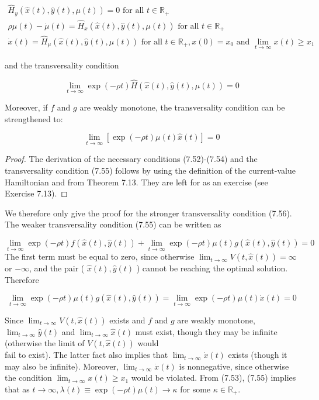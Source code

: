 \documentclass[\topdir/lecture_notes.tex]{subfiles}
\begin{document}
\[
\begin{gathered}
\hat{H}_{y}(\hat{x}(t), \hat{y}(t), \mu(t))=0 \text { for all } t \in \mathbb{R}_{+} \\
\rho \mu(t)-\dot{\mu}(t)=\hat{H}_{x}(\hat{x}(t), \hat{y}(t), \mu(t)) \text { for all } t \in \mathbb{R}_{+} \\
\dot{x}(t)=\hat{H}_{\mu}(\hat{x}(t), \hat{y}(t), \mu(t)) \text { for all } t \in \mathbb{R}_{+}, x(0)=x_{0} \text { and } \lim _{t \rightarrow \infty} x(t) \geq x_{1}
\end{gathered}
\]

and the transversality condition

\[
\lim _{t \rightarrow \infty} \exp (-\rho t) \hat{H}(\hat{x}(t), \hat{y}(t), \mu(t))=0
\]

Moreover, if $f$ and $g$ are weakly monotone, the transversality condition can be strengthened to:

\[
\lim _{t \rightarrow \infty}[\exp (-\rho t) \mu(t) \hat{x}(t)]=0
\]

\begin{proof}
The derivation of the necessary conditions (7.52)-(7.54) and the transversality condition (7.55) follows by using the definition of the current-value Hamiltonian and from Theorem 7.13. They are left for as an exercise (see Exercise 7.13).
\end{proof}

We therefore only give the proof for the stronger transversality condition (7.56). The weaker transversality condition (7.55) can be written as

\[
\lim _{t \rightarrow \infty} \exp (-\rho t) f(\hat{x}(t), \hat{y}(t))+\lim _{t \rightarrow \infty} \exp (-\rho t) \mu(t) g(\hat{x}(t), \hat{y}(t))=0
\]
The first term must be equal to zero, since otherwise $\lim _{t \rightarrow \infty} V(t, \hat{x}(t))=\infty$ or $-\infty$, and the pair ( $\hat{x}(t), \hat{y}(t)$ ) cannot be reaching the optimal solution. Therefore

\[
\lim _{t \rightarrow \infty} \exp (-\rho t) \mu(t) g(\hat{x}(t), \hat{y}(t))=\lim _{t \rightarrow \infty} \exp (-\rho t) \mu(t) \dot{x}(t)=0
\]

Since $\lim _{t \rightarrow \infty} V(t, \hat{x}(t))$ exists and $f$ and $g$ are weakly monotone, $\lim _{t \rightarrow \infty} \hat{y}(t)$ and $\lim _{t \rightarrow \infty} \hat{x}(t)$ must exist, though they may be infinite (otherwise the limit of $V(t, \hat{x}(t))$ would\\
fail to exist). The latter fact also implies that $\lim _{t \rightarrow \infty} \dot{x}(t)$ exists (though it may also be infinite). Moreover, $\lim _{t \rightarrow \infty} \dot{x}(t)$ is nonnegative, since otherwise the condition $\lim _{t \rightarrow \infty} x(t) \geq x_{1}$ would be violated. From (7.53), (7.55) implies that as $t \rightarrow \infty, \lambda(t) \equiv \exp (-\rho t) \mu(t) \rightarrow \kappa$ for some $\kappa \in \mathbb{R}_{+}$.
\end{document}
